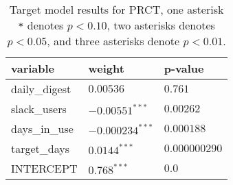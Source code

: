 \renewcommand{\arraystretch}{1.2}
\begin{table}
\begin{center}
\begin{tabular}{|p{4cm}|p{4cm}|p{4cm}|} 
\hline
variable & weight & p-value \\ [0.5ex]
\hline\hline

daily\_digest & $0.00536^{}$ & $0.761$ \\
slack\_users & $-0.00551^{***}$ & $0.00262$ \\
days\_in\_use & $-0.000234^{***}$ & $0.000188$ \\
target\_days & $0.0144^{***}$ & $0.000000290$ \\

\hline\hline
INTERCEPT & $0.768^{***}$ & $0.0$ \\ 

\hline
\end{tabular}
\caption{Target model results for PRCT, one asterisk \texttt{*} denotes  $p < 0.10$, two asterisks denotes $p < 0.05$, and three asterisks denote $p < 0.01$.}
\label{tab:target-prct-results}
\end{center}
\end{table}